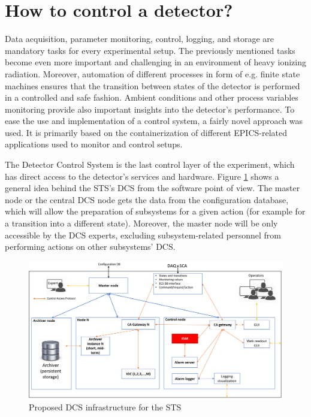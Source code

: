 \section{How to control a detector?}
Data acquisition, parameter monitoring, control, logging, and storage are mandatory tasks for every experimental setup. The previously mentioned tasks become even more important and challenging in an environment of heavy ionizing radiation. Moreover, automation of different processes in form of e.g. finite state machines ensures that the transition between states of the detector is performed in a controlled and safe fashion. Ambient conditions and other process variables monitoring provide also important insights into the detector's performance.  To ease the use and implementation of a control system, a fairly novel approach was used. It is primarily based on the containerization of different \gls{EPICS}-related applications used to monitor and control setups. 

The Detector Control System is the last control layer of the experiment, which has direct access to the detector's services and hardware. Figure \ref{fig_arch} shows a general idea behind the \gls{STS}'s \gls{DCS} from the software point of view.  The master node or the central \gls{DCS} node gets the data from the configuration database, which will allow the preparation of subsystems for a given action (for example for a transition into a different state). Moreover, the master node will be only accessible by the \gls{DCS} experts, excluding subsystem-related personnel from performing actions on other subsystems' \gls{DCS}. 

\begin{figure}[!h]
\centering
\includegraphics[width=0.85\columnwidth]{Chapter3/Controls/images/DCS.png}
\caption{Proposed \gls{DCS} infrastructure for the \gls{STS}}
\label{fig_arch}
\end{figure}
\newpage

